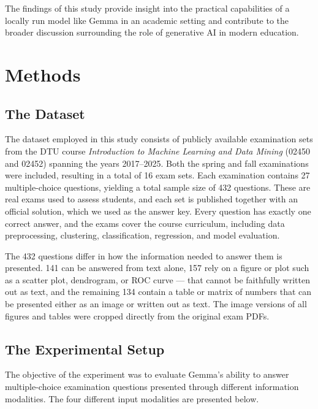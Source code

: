 \documentclass{article}
\begin{document}
The findings of this study provide insight into the practical capabilities of a locally run model like Gemma in an academic setting and contribute to the broader discussion surrounding the role of generative AI in modern education.



\section{Methods}
\subsection{The Dataset}

The dataset employed in this study consists of publicly available examination sets from the DTU course \textit{Introduction to Machine Learning and Data Mining} (02450 and 02452) spanning the years 2017--2025. Both the spring and fall examinations were included, resulting in a total of 16 exam sets. Each examination contains 27 multiple-choice questions, yielding a total sample size of 432 questions. These are real exams used to assess students, and each set is published together with an official solution, which we used as the answer key. Every question has exactly one correct answer, and the exams cover the course curriculum, including data preprocessing, clustering, classification, regression, and model evaluation.

The 432 questions differ in how the information needed to answer them is presented. 141 can be answered from text alone, 157 rely on a figure or plot such as a scatter plot, dendrogram, or ROC curve --- that cannot be faithfully written out as text, and the remaining 134 contain a table or matrix of numbers that can be presented either as an image or written out as text. The image versions of all figures and tables were cropped directly from the original exam PDFs.


\subsection{The Experimental Setup}

The objective of the experiment was to evaluate Gemma's ability to answer multiple-choice examination questions presented through different information modalities. The four different input modalities are presented below.
\end{document}
